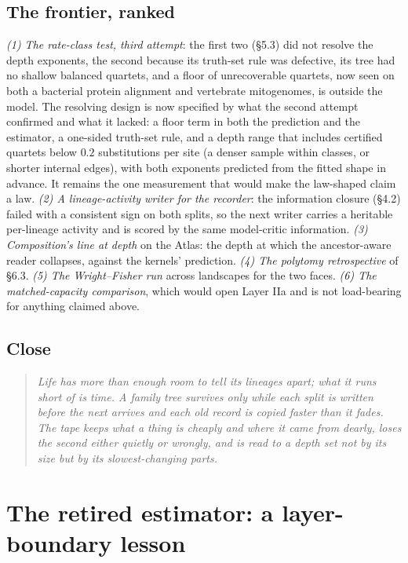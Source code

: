 \documentclass[11pt]{article}
\begin{document}
\subsection{The frontier, ranked}
\emph{(1) The rate-class test, third attempt}: the first two (\S5.3) did not resolve the depth exponents, the second because its truth-set rule was defective, its tree had no shallow balanced quartets, and a floor of unrecoverable quartets, now seen on both a bacterial protein alignment and vertebrate mitogenomes, is outside the model. The resolving design is now specified by what the second attempt confirmed and what it lacked: a floor term in both the prediction and the estimator, a one-sided truth-set rule, and a depth range that includes certified quartets below $0.2$ substitutions per site (a denser sample within classes, or shorter internal edges), with both exponents predicted from the fitted shape in advance. It remains the one measurement that would make the law-shaped claim a law. \emph{(2) A lineage-activity writer for the recorder}: the information closure (\S4.2) failed with a consistent sign on both splits, so the next writer carries a heritable per-lineage activity and is scored by the same model-critic information. \emph{(3) Composition's line at depth} on the Atlas: the depth at which the ancestor-aware reader collapses, against the kernels' prediction. \emph{(4) The polytomy retrospective} of \S6.3. \emph{(5) The Wright--Fisher run} across landscapes for the two faces. \emph{(6) The matched-capacity comparison}, which would open Layer IIa and is not load-bearing for anything claimed above.

\subsection*{Close}
\begin{quote}\itshape
Life has more than enough room to tell its lineages apart; what it runs short of is time. A family tree survives only while each split is written before the next arrives and each old record is copied faster than it fades. The tape keeps what a thing is cheaply and where it came from dearly, loses the second either quietly or wrongly, and is read to a depth set not by its size but by its slowest-changing parts.
\end{quote}

\appendix
\section{The retired estimator: a layer-boundary lesson}
\end{document}
